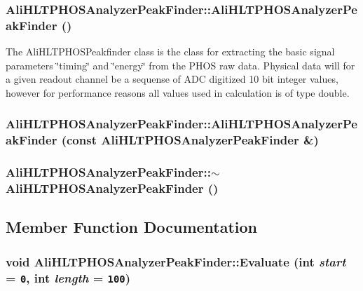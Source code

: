 \subsubsection{\setlength{\rightskip}{0pt plus 5cm}Ali\-HLTPHOSAnalyzer\-Peak\-Finder::Ali\-HLTPHOSAnalyzer\-Peak\-Finder ()}\label{classAliHLTPHOSAnalyzerPeakFinder_a0}


The Ali\-HLTPHOSPeakfinder class is the class for extracting the basic signal parameters \char`\"{}timing\char`\"{} and \char`\"{}energy\char`\"{} from the PHOS raw data. Physical data will for a given readout channel be a sequense of ADC digitized 10 bit integer values, however for performance reasons all values used in calculation is of type double. 
\subsubsection{\setlength{\rightskip}{0pt plus 5cm}Ali\-HLTPHOSAnalyzer\-Peak\-Finder::Ali\-HLTPHOSAnalyzer\-Peak\-Finder (const {\bf Ali\-HLTPHOSAnalyzer\-Peak\-Finder} \&)}\label{classAliHLTPHOSAnalyzerPeakFinder_a1}


\subsubsection{\setlength{\rightskip}{0pt plus 5cm}Ali\-HLTPHOSAnalyzer\-Peak\-Finder::$\sim${\bf Ali\-HLTPHOSAnalyzer\-Peak\-Finder} ()\hspace{0.3cm}{\tt  [virtual]}}\label{classAliHLTPHOSAnalyzerPeakFinder_a3}




\subsection{Member Function Documentation}
\subsubsection{\setlength{\rightskip}{0pt plus 5cm}void Ali\-HLTPHOSAnalyzer\-Peak\-Finder::Evaluate (int {\em start} = {\tt 0}, int {\em length} = {\tt 100})\hspace{0.3cm}{\tt  [virtual]}}\label{classAliHLTPHOSAnalyzerPeakFinder_a6}


